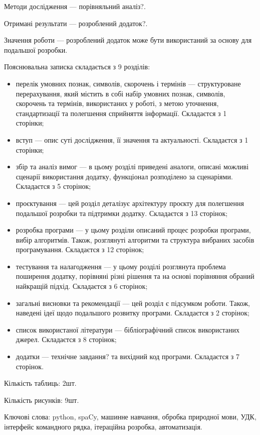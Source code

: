 \documentclass[14pt]{extarticle}
\begin{document}
Методи дослідження --- порівняльний аналіз?.

Отримані результати --- розроблений додаток?.

Значення роботи --- розроблений додаток може
бути використаний за основу для подальшої розробки.

Пояснювальна записка складається з 9 розділів:
\begin{itemize}[labelindent=\dimexpr{}\relax, leftmargin=*]
  \item перелік умовних познак, символів, скорочень і термінів ---
    структуроване перерахування, який містить в собі набір умовних познак,
    символів, скорочень та термінів, використаних у роботі, з метою уточнення,
    стандартизації та полегшення сприйняття інформації. Складаєтся з 1 сторінки;
  \item вступ --- опис суті дослідження, її значення та актуальності.
    Складаєтся з 1 сторінки;
  \item збір та аналіз вимог --- в цьому розділі приведені аналоги,
    описані можливі сценарії використання додатку,
    функціонал розподілено за сценаріями. Складаєтся з 5 сторінок;
  \item проєктування --- цей розділ деталізує архітектуру проєкту
    для полегшення подальшої розробки та підтримки додатку.
    Складаєтся з 13 сторінок; 
  \item розробка програми --- у цьому розділи описаний процес розробки програми,
    вибір алгоритмів. Також,
    розглянуті алгоритми та структура вибраних засобів програмування.
    Складаєтся з 12 сторінок;
  \item тестування та налагодження ---
    у цьому розділі розглянута проблема поширення додатку,
    порівняні різні рішення та на основі порівняння обраний найкращій підхід.
    Складаєтся з 6 сторінок;
  \item загальні висновки та рекомендації ---
    цей розділ є підсумком роботи.
    Також, наведені ідеї щодо подальшого розвитку програми.
    Складаєтся з 2 сторінок;
  \item список використаної літератури ---
    бібліографічний список використаних джерел. Складаєтся з 8 сторінок;
  \item додатки ---
    технічне завдання? та вихідний код програми. Складаєтся з 7 сторінок.
\end{itemize}

Кількість таблиць: 2шт.

Кількість рисунків: 9шт.

Ключові слова: python, spaCy, машинне навчання, обробка природної мови,
УДК, інтерфейс командного рядка, ітераційна розробка, автоматизація.
\end{document}
